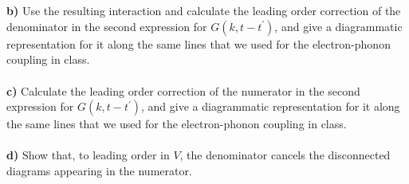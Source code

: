 \begin{problem}
\ \\
\ \\
{\bf b)} Use the resulting interaction and calculate the leading order correction of the denominator in the second expression for $G(k, t-t^{\prime})$, and give a diagrammatic representation for it along the same lines that we used for the electron-phonon coupling in class.  
\ \\
\ \\
{\bf c)} Calculate the leading order correction of the numerator in the second expression for $G(k, t-t^{\prime})$, and give a diagrammatic representation for it along the same lines that we used for the electron-phonon coupling in class.  
\ \\
\ \\
{\bf d)} Show that, to leading order in $V$, the denominator cancels the disconnected diagrams appearing in the numerator.  
\ \\
\ \\
\end{problem}

